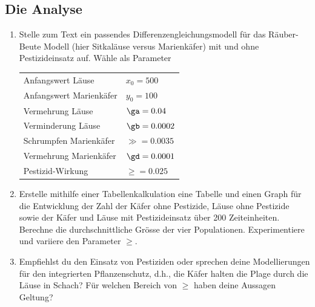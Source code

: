 \documentclass[%
11pt,%
twoside,%
titlepage,%
german,%
headsepline%
]{scrartcl}
\newcommand{\spaltenheight}{\rule{0mm}{3ex}}
\newcommand{\spaltensep}{\\[1ex]}
\begin{document}
\subsection{Die Analyse}
\begin{enumerate}
\item Stelle zum Text ein passendes Differenzengleichungsmodell für das Räuber-Beute Modell (hier Sitkaläuse versus Marienkäfer) mit und ohne Pestizideinsatz auf. Wähle als Parameter

\begin{center}
\begin{tabular}{ll}
\spaltenheight Anfangswert Läuse & $x_0=500$\spaltensep
\spaltenheight Anfangswert Marienkäfer\hspace*{3ex} & $y_0=100$\spaltensep
\spaltenheight Vermehrung Läuse & $\ga=0.04$\spaltensep
\spaltenheight Verminderung Läuse & $\gb=0.0002$\spaltensep
\spaltenheight Schrumpfen Marienkäfer & $\gg=0.0035$\spaltensep
\spaltenheight Vermehrung Marienkäfer & $\gd=0.0001$\spaltensep
\spaltenheight Pestizid-Wirkung & $\ge=0.025$
\end{tabular}
\end{center}

\item Erstelle mithilfe einer Tabellenkalkulation eine Tabelle und einen Graph für die Entwicklung der Zahl der Käfer ohne Pestizide, Läuse ohne Pestizide sowie der Käfer und Läuse mit Pestizideinsatz über 200 Zeiteinheiten. Berechne die durchschnittliche Grösse der vier Populationen. Experimentiere und variiere den Parameter $\ge$.

\item Empfiehlst du den Einsatz von Pestiziden oder sprechen deine Modellierungen für den integrierten Pflanzenschutz, d.h., die Käfer halten die Plage durch die Läuse in Schach? Für welchen Bereich von $\ge$ haben deine Aussagen Geltung?
\end{enumerate}

\clearpage




\end{document}
